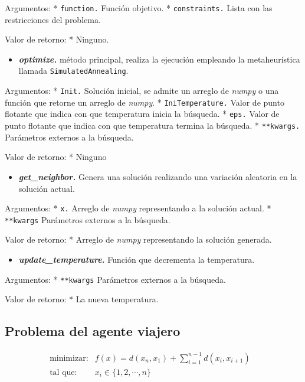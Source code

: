 \documentclass[11pt]{article}
\providecommand{\tightlist}{%
      \setlength{\itemsep}{0pt}\setlength{\parskip}{0pt}}
\begin{document}
Argumentos: * \texttt{function.} Función objetivo. *
\texttt{constraints.} Lista con las restricciones del problema.

Valor de retorno: * Ninguno.

\begin{itemize}
\tightlist
\item
  \emph{\textbf{optimize.}} método principal, realiza la ejecución
  empleando la metaheurística llamada \texttt{SimulatedAnnealing}.
\end{itemize}

Argumentos: * \texttt{Init.} Solución inicial, se admite un arreglo de
\emph{numpy} o una función que retorne un arreglo de \emph{numpy}. *
\texttt{IniTemperature.} Valor de punto flotante que indica con que
temperatura inicia la búsqueda. * \texttt{eps.} Valor de punto flotante
que indica con que temperatura termina la búsqueda. * \texttt{**kwargs.}
Parámetros externos a la búsqueda.

Valor de retorno: * Ninguno

\begin{itemize}
\tightlist
\item
  \emph{\textbf{get\_neighbor.}} Genera una solución realizando una
  variación aleatoria en la solución actual.
\end{itemize}

Argumentos: * \texttt{x.} Arreglo de \emph{numpy} representando a la
solución actual. * \texttt{**kwargs} Parámetros externos a la búsqueda.

Valor de retorno: * Arreglo de \emph{numpy} representando la solución
generada.

\begin{itemize}
\tightlist
\item
  \emph{\textbf{update\_temperature.}} Función que decrementa la
  temperatura.
\end{itemize}

Argumentos: * \texttt{**kwargs} Parámetros externos a la búsqueda.

Valor de retorno: * La nueva temperatura.

    \subsection{Problema del agente
viajero}\label{problema-del-agente-viajero}

\begin{equation}
    \label{eq:TSP}
    \begin{array}{rll}
    \text{minimizar:} & f(x) = d(x_n, x_1) + \sum_{i=1}^{n-1} d(x_i, x_{i+1}) &  \\
    \text{tal que: } & x_i \in \{1,2,\cdots,n\} & \\
    \end{array}
\end{equation}
\end{document}
